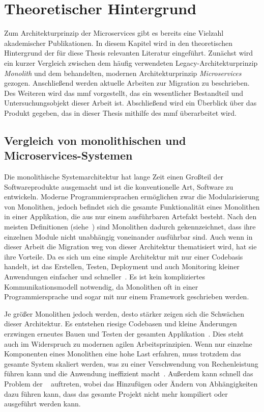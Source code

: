 \chapter{Theoretischer Hintergrund}
\label{chap:theoretischer-hintergrund}
Zum Architekturprinzip der Microservices gibt es bereits eine Vielzahl akademischer Publikationen.
In diesem Kapitel wird in den theoretischen Hintergrund der für diese Thesis relevanten Literatur eingeführt.
Zunächst wird ein kurzer Vergleich zwischen dem häufig verwendeten Legacy-Architekturprinzip \emph{Monolith} und dem behandelten, modernen Architekturprinzip \emph{Microservices} gezogen.
Anschließend werden aktuelle Arbeiten zur Migration zu  beschrieben.
Des Weiteren wird das \acrfull{mmf} vorgestellt, das ein wesentlicher Bestandteil und Untersuchungsobjekt dieser Arbeit ist.
Abschließend wird ein Überblick über das Produkt gegeben, das in dieser Thesis mithilfe des \gls{mmf} überarbeitet wird.

\section{Vergleich von monolithischen und Microservices-Systemen}
\label{sec:monolith-vs-microservices}

Die monolithische Systemarchitektur hat lange Zeit einen Großteil der Softwareprodukte ausgemacht und ist die konventionelle Art, Software zu entwickeln.
Moderne Programmiersprachen ermöglichen zwar die Modularisierung von Monolithen, jedoch befindet sich die gesamte Funktionalität eines Monolithen in einer Applikation, die aus nur einem ausführbaren Artefakt besteht.
Nach den meisten Definitionen (siehe~\cite{Dragoni2017}) sind Monolithen dadurch gekennzeichnet, dass ihre einzelnen Module nicht unabhängig voneinander ausführbar sind.
Auch wenn in dieser Arbeit die Migration weg von dieser Architektur thematisiert wird, hat sie ihre Vorteile.
Da es sich um eine simple Architektur mit nur einer Codebasis handelt, ist das Erstellen, Testen, Deployment und auch Monitoring kleiner Anwendungen einfacher und schneller~\cite{a-survey-on}.
Es ist kein kompliziertes Kommunikationsmodell notwendig, da Monolithen oft in einer Programmiersprache und sogar mit nur einem Framework geschrieben werden.

Je größer Monolithen jedoch werden, desto stärker zeigen sich die Schwächen dieser Architektur.
Es entstehen riesige Codebasen und kleine Änderungen erzwingen erneutes Bauen und Testen der gesamten Applikation~\cite{Dragoni2017}.
Dies steht auch im Widerspruch zu modernen agilen Arbeitsprinzipien.
Wenn nur einzelne Komponenten eines Monolithen eine hohe Last erfahren, muss trotzdem das gesamte System skaliert werden, was zu einer Verschwendung von Rechenleistung führen kann und die Anwendung ineffizient macht~\cite{Dragoni2017}.
Außerdem kann schnell das Problem der ~\cite{Dragoni2017} auftreten, wobei das Hinzufügen oder Ändern von Abhängigkeiten dazu führen kann, dass das gesamte Projekt nicht mehr kompiliert oder ausgeführt werden kann.

